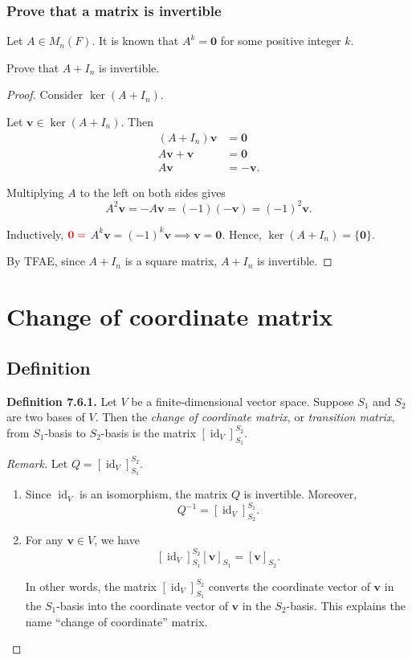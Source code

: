 \documentclass[12pt]{article}
\newenvironment{Remark}
{\begin{proof}[Remark]}
{\end{proof}}
\begin{document}
\subsubsection{Prove that a matrix is invertible}
Let $A\in M_n(F)$. It is known that $A^k=\mathbf{0}$
for some positive integer $k$.

Prove that $A+I_n$ is invertible.

\begin{proof}
Consider $\ker(A+I_n)$.

Let $\mathbf{v}\in\ker(A+I_n)$. Then
\begin{align*}
(A+I_n)\mathbf{v}&=\mathbf{0}\\
A\mathbf{v}+\mathbf{v}&=\mathbf{0}\\
A\mathbf{v}&=-\mathbf{v}.
\end{align*}

Multiplying $A$ to the left on both sides gives
\[
A^2\mathbf{v}
=-A\mathbf{v}
=(-1)(-\mathbf{v})
=(-1)^2\mathbf{v}.
\]

Inductively, $\textcolor{red}{\mathbf{0} =}$ $A^k\mathbf{v}=(-1)^k\mathbf{v}\implies \mathbf{v}=\mathbf{0}$.
Hence, $\ker(A+I_n)=\{\mathbf{0}\}$.

By TFAE, since $A+I_n$ is a square matrix, $A+I_n$ is invertible.
\end{proof}

\section{Change of coordinate matrix}

\subsection{Definition}

\textbf{Definition 7.6.1.}
Let $V$ be a finite-dimensional vector space. Suppose $S_1$ and $S_2$
are two bases of $V$. Then the \emph{change of coordinate matrix},
or \emph{transition matrix}, from $S_1$-basis to $S_2$-basis is the matrix
$[\operatorname{id}_V]_{S_1}^{S_2}$.

\begin{Remark}
Let $Q=[\operatorname{id}_V]_{S_1}^{S_2}$.

\begin{enumerate}
    \item Since $\operatorname{id}_V$ is an isomorphism, the matrix $Q$
    is invertible. Moreover,
    \[
    Q^{-1}
    =
    [\operatorname{id}_V]_{S_2}^{S_1}.
    \]

    \item For any $\mathbf{v}\in V$, we have
    \[
    [\operatorname{id}_V]_{S_1}^{S_2}
    [\mathbf{v}]_{S_1}
    =
    [\mathbf{v}]_{S_2}.
    \]

    In other words, the matrix
    $[\operatorname{id}_V]_{S_1}^{S_2}$ converts the coordinate vector
    of $\mathbf{v}$ in the $S_1$-basis into the coordinate vector of
    $\mathbf{v}$ in the $S_2$-basis. This explains the name
    ``change of coordinate'' matrix.
\end{enumerate}
\end{Remark}
\end{document}

